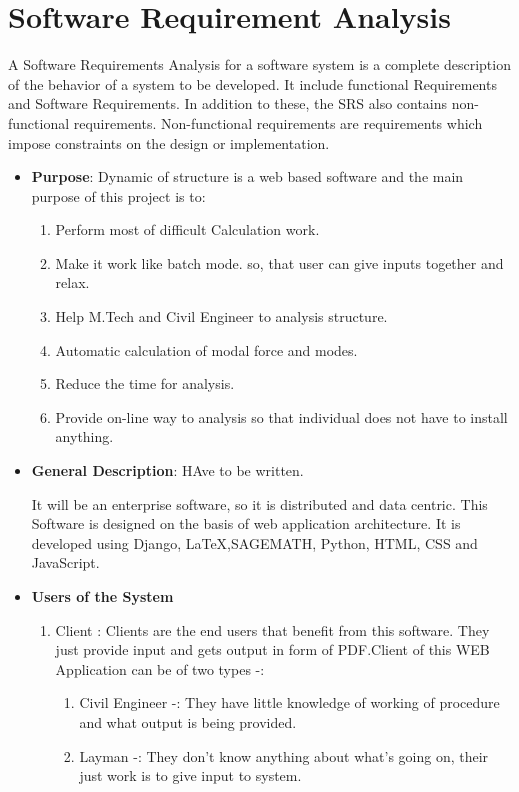 \section{Software Requirement Analysis}

A Software Requirements Analysis for a software system is a complete 
description of the behavior of a system to be developed. It include functional Requirements
and Software Requirements. In addition to these, the SRS also contains 
non-functional requirements. Non-functional requirements are 
requirements which impose constraints on the design or implementation.
\begin{itemize}
\item{\bf Purpose}: Dynamic of structure is a web based software and the 
main purpose of this project is to:
\begin{enumerate}
\item Perform most of difficult Calculation work.
\item Make it work like batch mode. so, that user can give inputs 
together and relax.
\item Help M.Tech and Civil Engineer to analysis structure.
\item Automatic calculation of modal force and modes.
\item Reduce the time for analysis.
\item Provide on-line way to analysis so that individual does not have to 
install anything.
\end{enumerate}
\item{\bf General Description}: HAve to be written.

It will be an enterprise software, so it is distributed and data centric. 
This Software is designed on the basis of web application architecture.
It is developed using Django, \LaTeX{},SAGEMATH, Python, HTML, CSS and JavaScript.
\item{\bf Users of the System}
\begin{enumerate} 
\item Client : Clients are the end users that benefit from this software.
They just provide input and gets output in form of PDF.Client of this 
WEB Application can be of two types -:
\begin{enumerate}
\item Civil Engineer -: They have little knowledge of working of procedure
and what output is being provided.
\item Layman -: They don't know anything about what's going on, their just 
work is to give input to system.   
 
\end{enumerate}
\end{enumerate}
\end{itemize}

